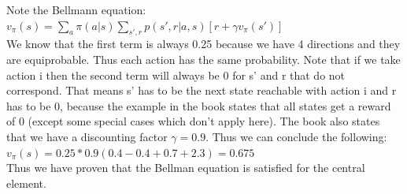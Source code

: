 \documentclass[12pt,a4paper]{article}
\begin{document}
Note the Bellmann equation: 
$v_{\pi}(s) = \sum_{a}\pi(a|s) \sum_{s',r}p(s',r|a,s)[r+ \gamma v_{\pi}(s')]$\\
We know that the first term is always 0.25 because we have 4 directions and they are equiprobable. Thus each action has the same probability. Note that if we take action i then the second term will always be 0 for s' and r that do not correspond. That means s' has to be the next state reachable with action i and r has to be 0, because the example in the book states that all states get a reward of 0 (except some special cases which don't apply here). The book also states that we have a discounting factor $\gamma = 0.9$. Thus we can conclude the following: 
$v_{\pi}(s) = 0.25*0.9(0.4-0.4+0.7+2.3) = 0.675$\\
Thus we have proven that the Bellman equation is satisfied for the central element. 
\end{document}
